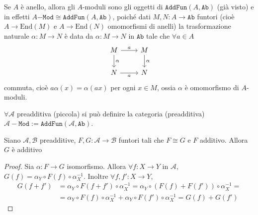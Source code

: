 \begin{example}{}
    Se \(A\) è anello, allora gli \(A\)-moduli sono gli oggetti di \(\mathtt{AddFun}{(A, \mathtt{Ab})}\) (già visto)
    e in effetti \(A\mathtt{-Mod} \cong \mathtt{AddFun}{(A, \mathtt{Ab})}\),
    poiché dati \(M, N : A \to \mathtt{Ab}\) funtori (cioè \(A \to \mathrm{End}{(M)}\) e \(A \to \mathrm{End}{(N)}\) omomorfismi di anelli) la trasformazione naturale \(\alpha : M \to N\) è data da
    \(\alpha : M \to N\) in \(\mathtt{Ab}\) tale che \(\forall a \in A\) 
\[\begin{tikzcd}
	{M} & {M} \\
	{N} & {N}
	\arrow["{a}", from=1-1, to=1-2]
	\arrow["{\alpha}", from=1-1, to=2-1]
	\arrow["{\alpha}", from=1-2, to=2-2]
	\arrow["{a}"', from=2-1, to=2-2]
\end{tikzcd}\]
commuta, cioè \(a \alpha {(x)} = \alpha {(a x)}\) per ogni \(x \in M\), ossia \(
\alpha \) è omomorfismo di \(A\)-moduli.
\end{example}
\begin{remark}{}
    \(\forall \mathcal{A}\) preadditiva (piccola) si può definire la categoria
    (preadditiva) \(\mathcal{A-}\mathtt{Mod} := \mathtt{AddFun}{(\mathcal{A}, \mathtt{Ab})}\).
\end{remark}
\begin{proposition}{}
    Siano \(\mathcal{A}, \mathcal{B}\) preadditive, \(F, G : \mathcal{A} \to
    \mathcal{B}\) funtori tali che \(F \cong G\) e \(F\) additivo. Allora \(G\)
    è additivo
\end{proposition}
\begin{proof}{}
    Sia \(\alpha : F \to G\) isomorfismo. Allora \(\forall  f : X \to Y\) in \(\mathcal{A}\), 
    \(G{(f)} = \alpha_Y \circ F{(f)} \circ \alpha_X^{-1}\).
    Inoltre \(\forall f, f' : X \to Y\),
    \begin{align*}G{(f + f')} &= \alpha_Y \circ F{(f +
    f')} \circ \alpha_X^{-1} = \alpha_Y \circ {(F{(f)} + F{(f')})} \circ \alpha_X^{-1} = \\
    &= \alpha_Y \circ F{(f)} \circ \alpha_X^{-1} + \alpha_Y \circ F{(f')} \circ
    \alpha_X^{-1} = G{(f)} + G{(f')}
\end{align*}
\end{proof}

